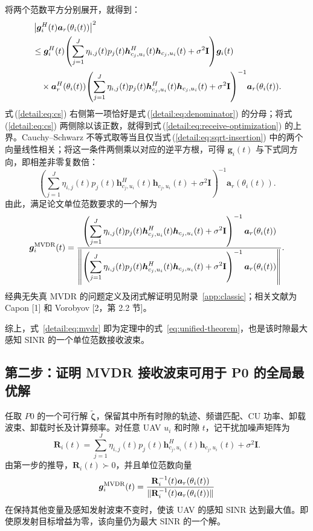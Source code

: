 \documentclass[11pt,a4paper]{ctexart}
\begin{document}
将两个范数平方分别展开，就得到：
\begin{align}
&\left|\bm g_i^H(t)\bm a_r(\theta_i(t))\right|^2\notag\\
&\le\bm g_i^H(t)\!\left(\sum_{j=1}^J\eta_{i,j}(t)p_j(t)
\bm h_{c_j,u_i}^{H}(t)\bm h_{c_j,u_i}(t)+\sigma^2\mathbf I\right)\!\bm g_i(t)\notag\\
&\quad\times\bm a_r^H(\theta_i(t))\!\left(\sum_{j=1}^J\eta_{i,j}(t)p_j(t)
\bm h_{c_j,u_i}^{H}(t)\bm h_{c_j,u_i}(t)+\sigma^2\mathbf I\right)^{-1}\!\bm a_r(\theta_i(t)).\label{detail:eq:cs}
\end{align}
式\,(\ref{detail:eq:cs}) 右侧第一项恰好是式\,(\ref{detail:eq:denominator}) 的分母；将式\,(\ref{detail:eq:cs}) 两侧除以该正数，就得到式\,(\ref{detail:eq:receive-optimization}) 的上界。Cauchy--Schwarz 不等式取等当且仅当式\,(\ref{detail:eq:sqrt-insertion}) 中的两个向量线性相关；将这一条件两侧乘以对应的逆平方根，可得 $\bm g_i(t)$ 与下式同方向，即相差非零复数倍：
\begin{equation}\label{detail:eq:direction}
\left(\sum_{j=1}^J\eta_{i,j}(t)p_j(t)
\bm h_{c_j,u_i}^{H}(t)\bm h_{c_j,u_i}(t)+\sigma^2\mathbf I\right)^{-1}
\bm a_r(\theta_i(t)).
\end{equation}
由此，满足论文单位范数要求的一个解为
\begin{equation}\label{detail:eq:mvdr}
\bm g_i^{\rm MVDR}(t)=
\frac{\left(\displaystyle\sum_{j=1}^J\eta_{i,j}(t)p_j(t)
\bm h_{c_j,u_i}^{H}(t)\bm h_{c_j,u_i}(t)+\sigma^2\mathbf I\right)^{-1}
\bm a_r(\theta_i(t))}
{\left\|\left(\displaystyle\sum_{j=1}^J\eta_{i,j}(t)p_j(t)
\bm h_{c_j,u_i}^{H}(t)\bm h_{c_j,u_i}(t)+\sigma^2\mathbf I\right)^{-1}
\bm a_r(\theta_i(t))\right\|}.
\end{equation}
经典无失真 MVDR 的问题定义及闭式解证明见附录~\ref{app:classic}；相关文献为 Capon [1] 和 Vorobyov [2，第 2.2 节]。




综上，式~\eqref{detail:eq:mvdr} 即为定理中的式~\eqref{eq:unified-theorem}，也是该时隙最大感知 SINR 的一个单位范数接收波束。



\subsection{第二步：证明 MVDR 接收波束可用于 P0 的全局最优解}

任取 $P0$ 的一个可行解 $\tilde{\bm\zeta}$，保留其中所有时隙的轨迹、频谱匹配、CU 功率、卸载波束、卸载时长及计算频率。对任意 UAV $u_i$ 和时隙 $t$，记干扰加噪声矩阵为
\begin{equation}\label{eq:new-cov}
\mathbf R_i(t)=\sum_{j=1}^{J}\eta_{i,j}(t)p_j(t)\bm h_{c_j,u_i}^{H}(t)\bm h_{c_j,u_i}(t)+\sigma^2\mathbf I.
\end{equation}
由第一步的推导，$\mathbf R_i(t)\succ0$，并且单位范数向量
\begin{equation}\label{eq:new-mvdr}
\bm g_i^{\rm MVDR}(t)=\frac{\mathbf R_i^{-1}(t)\bm a_r(\theta_i(t))}{\|\mathbf R_i^{-1}(t)\bm a_r(\theta_i(t))\|}
\end{equation}
在保持其他变量及感知发射波束不变时，使该 UAV 的感知 SINR 达到最大值。即使原发射目标增益为零，该向量仍为最大 SINR 的一个解。
\end{document}
